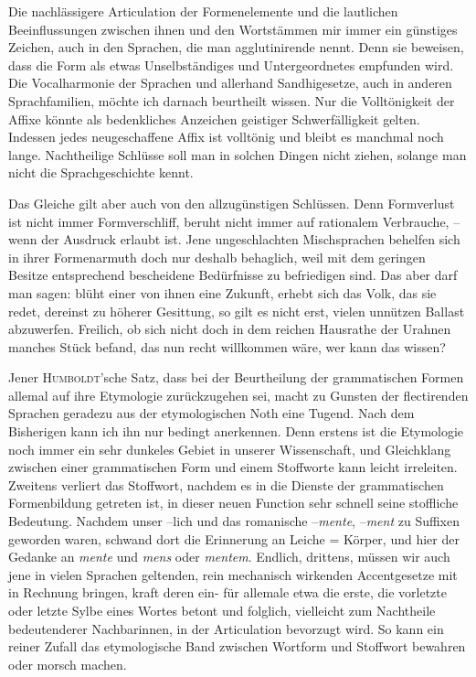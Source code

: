 Die nachlässigere Articulation der Formenelemente und die lautlichen Beeinflussungen zwischen ihnen und den Wortstämmen  mir immer ein günstiges Zeichen, auch in den Sprachen, die man agglutinirende nennt. Denn sie beweisen, dass die Form als etwas Unselbstän\label{fp.416}diges und Untergeordnetes empfunden wird. Die Vocalharmonie der  Sprachen und allerhand Sandhigesetze, auch in anderen Sprachfamilien, möchte ich darnach beurtheilt wissen. Nur die Volltönigkeit der Affixe könnte als bedenkliches Anzeichen geistiger Schwerfälligkeit gelten. Indessen jedes neugeschaffene Affix ist volltönig und bleibt es manchmal noch lange. Nachtheilige Schlüsse soll man in solchen Dingen nicht ziehen, solange man nicht die Sprachgeschichte kennt.

\label{sp.437}

Das Gleiche gilt aber auch von den allzugünstigen Schlüssen. Denn Formverlust ist nicht immer Formverschliff, beruht nicht immer auf rationalem Verbrauche, – wenn der Ausdruck erlaubt ist. Jene ungeschlachten Mischsprachen behelfen sich in ihrer Formenarmuth doch nur deshalb behaglich, weil mit dem geringen Besitze entsprechend bescheidene Bedürfnisse zu befriedigen sind. Das aber darf man sagen: blüht einer von ihnen eine Zukunft, erhebt sich das Volk, das sie redet, dereinst zu höherer Gesittung, so gilt es nicht erst, vielen unnützen Ballast abzuwerfen. Freilich, ob sich nicht doch in dem reichen Hausrathe der Urahnen manches Stück befand, das nun recht willkommen wäre, wer kann das wissen?

Jener \textsc{Humboldt}’sche Satz, dass bei der Beurtheilung der grammatischen Formen allemal auf ihre Etymologie zurückzugehen sei, macht zu Gunsten der flectirenden Sprachen geradezu aus der etymologischen Noth eine Tugend. Nach dem Bisherigen kann ich ihn nur bedingt anerkennen. Denn erstens ist die Etymologie noch immer ein sehr dunkeles Gebiet in unserer Wissenschaft, und Gleichklang zwischen einer grammatischen Form und einem Stoffworte kann leicht irreleiten. Zweitens verliert das Stoffwort, nachdem es in die Dienste der grammatischen Formenbildung getreten ist, in dieser neuen Function sehr schnell seine stoffliche Bedeutung. Nachdem unser –lich und das romanische –\textit{mente}, –\textit{ment} zu Suffixen geworden waren, schwand dort die Erinnerung an Leiche = Körper, und hier der Gedanke an \textit{mente} und \textit{mens} oder \textit{mentem}. Endlich, drittens, müssen wir auch jene in vielen Sprachen geltenden, rein mechanisch wirkenden Accentgesetze mit in Rechnung bringen, kraft deren ein- für allemale etwa die erste, die vorletzte oder letzte Sylbe eines Wortes betont und folglich, vielleicht zum Nachtheile bedeutenderer Nachbarinnen, in der Articulation bevorzugt wird. So kann ein reiner Zufall das etymologische Band zwischen Wortform und Stoffwort bewahren oder morsch machen.


